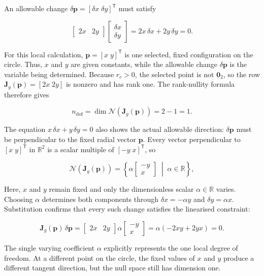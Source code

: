 \documentclass[
  australian,
  12pt,
  letterpaper,
  DIV=11,
  numbers=noendperiod,
  twoside]{scrreprt}
\begin{document}
An allowable change \(\delta\mathbf p=[\delta x\;\delta y]^\mathsf T\)
must satisfy

\[
\begin{bmatrix}
2x&2y
\end{bmatrix}
\begin{bmatrix}
\delta x\\
\delta y
\end{bmatrix}
=
2x\,\delta x+2y\,\delta y
=
0.
\]

For this local calculation, \(\mathbf p=[x\;y]^\mathsf T\) is one
selected, fixed configuration on the circle. Thus, \(x\) and \(y\) are
given constants, while the allowable change \(\delta\mathbf p\) is the
variable being determined. Because \(r_c>0\), the selected point is not
\(\mathbf0_2\), so the row \(\mathbf J_g(\mathbf p)=[2x\;2y]\) is
nonzero and has rank one. The rank-nullity formula therefore gives

\[
\boxed{
n_{\mathrm{dof}}
=
\dim\mathcal N\!\left(\mathbf J_g(\mathbf p)\right)
=
2-1
=
1
}.
\]

The equation \(x\,\delta x+y\,\delta y=0\) also shows the actual
allowable direction: \(\delta\mathbf p\) must be perpendicular to the
fixed radial vector \(\mathbf p\). Every vector perpendicular to
\([x\;y]^\mathsf T\) in \(\mathbb R^2\) is a scalar multiple of
\([-y\;x]^\mathsf T\), so

\[
\mathcal N\!\left(\mathbf J_g(\mathbf p)\right)
=
\left\{
\alpha
\begin{bmatrix}
-y\\x
\end{bmatrix}
\;\middle|\;
\alpha\in\mathbb R
\right\},
\]

Here, \(x\) and \(y\) remain fixed and only the dimensionless scalar
\(\alpha\in\mathbb R\) varies. Choosing \(\alpha\) determines both
components through \(\delta x=-\alpha y\) and \(\delta y=\alpha x\).
Substitution confirms that every such change satisfies the linearised
constraint:

\[
\mathbf J_g(\mathbf p)\,\delta\mathbf p
=
\begin{bmatrix}
2x&2y
\end{bmatrix}
\alpha
\begin{bmatrix}
-y\\x
\end{bmatrix}
=
\alpha(-2xy+2yx)
=
0.
\]

The single varying coefficient \(\alpha\) explicitly represents the one
local degree of freedom. At a different point on the circle, the fixed
values of \(x\) and \(y\) produce a different tangent direction, but the
null space still has dimension one.
\end{document}

